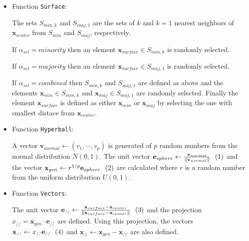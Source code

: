 \documentclass[parskip=full]{scrartcl}
\newcommand{\inlineeqnum}{\refstepcounter{equation}~~\mbox{(\theequation)}}
\begin{document}
\begin{itemize}
	
	\renewcommand\labelitemi{--}
	
	\item Function \texttt{Surface}:
	
		The sets  \( S_{min, k} \) and \( S_{maj, 1} \) are the sets of \( k \) and \( k = 1 \) nearest neighbors of \( \textbf{x}_{center} \) from \( S_{min} \) and \( S_{maj} \), respectively.
	
		If \( \alpha_{sel} = minority \) then an element \( \textbf{x}_{surface} \in S_{min, k}\) is randomly selected.
			
		If \( \alpha_{sel} = majority \) then an element \( \textbf{x}_{surface} \in S_{maj, 1}\) is randomly selected.
			
		If \( \alpha_{sel} = combined \) then \( S_{min, k} \) and \( S_{maj, 1} \) are defined as above and the elements \( \textbf{x}_{min} \in S_{min, k}\) and  \( \textbf{x}_{maj} \in S_{maj, 1}\) are randomly selected. Finally the element \( \textbf{x}_{surface} \) is defined as either \( \textbf{x}_{min} \) or \( \textbf{x}_{maj} \) by selecting the one with smallest distace from \( \textbf{x}_{center} \).
			
	
	\item Function \texttt{Hyperball}:
		
		A vector \( \textbf{v}_{normal} \leftarrow (v_{1}, \cdots, v_{p}) \) is generated of \( p \) random numbers from the normal distribution \( N(0, 1) \). The unit vector \( \textbf{e}_{sphere} \leftarrow \frac{\textbf{v}_{normal}}{ \|\textbf{v}_{normal} \|} \inlineeqnum\label{eqn:sphere} \) and the vector \( \textbf{x}_{gen} \leftarrow r^{1 / p} \textbf{e}_{sphere} \inlineeqnum\label{eqn:ball} \) are calculated where \( r \) is a random number from the uniform distribution \( U(0, 1) \).
			
	\item Function \texttt{Vectors}:
	
		The unit vector \( \textbf{e}_{\scriptscriptstyle//} \leftarrow \frac{\textbf{x}_{surface} - \textbf{x}_{center}}{ \|\textbf{x}_{surface} - \textbf{x}_{center} \|} \inlineeqnum\label{eqn:unit} \) and the projection  \( x_{\scriptscriptstyle//} = \textbf{x}_{gen} \cdot \textbf{e}_{\scriptscriptstyle//} \)  are defined. Using this projection, the vectors \( \textbf{x}_{\scriptscriptstyle//} \leftarrow x_{\scriptscriptstyle//} \textbf{e}_{\scriptscriptstyle//}  \inlineeqnum\label{eqn:parallel} \) and \( \textbf{x}_{\bot} \leftarrow \textbf{x}_{gen} - \textbf{x}_{\scriptscriptstyle//} \) are also defined.
	 		

\end{itemize}
\end{document}
